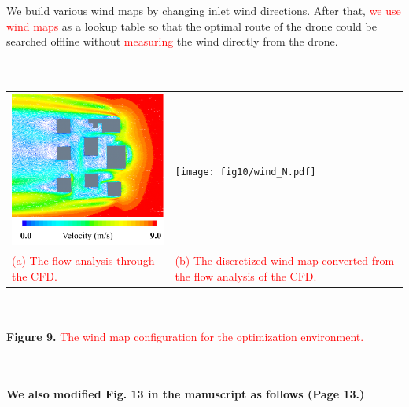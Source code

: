 \documentclass[onecolumn]{IEEEconf}
\begin{document}
\begin{description}
\begin{mdframed}[ linewidth=.75pt, userdefinedwidth=0.9\textwidth]
{    %
    We build various wind maps by changing inlet wind directions.}
    After that, \textcolor{red}{we use wind maps} as a lookup table so that the optimal route of the drone could be searched offline without \textcolor{red}{measuring} the wind directly from the drone.
    \\~\\
    ~\par
    \centering
    \setcounter{figure}{9}
    \begin{tabular}{m{}m{}}
        \includegraphics[scale=0.59]{fig10/CFD_map.pdf} &  \texttt{[image: fig10/wind\_N.pdf]} \\
        \small \textcolor{red}{(a) The flow analysis through the CFD.} &
        \small \textcolor{red}{(b) The discretized wind map converted from the flow analysis of the CFD.} \\
    \end{tabular}
    \\~\\
    \textbf{Figure 9.} \textcolor{red}{The wind map configuration for the optimization environment.}
    \label{fig: wind_map}
 \end{mdframed}     
    ~\\
    ~\pagebreak ~
    ~\\
    \textbf{We also modified Fig. 13 in the manuscript as follows (Page 13.)}\\

\end{description}
\end{document}
